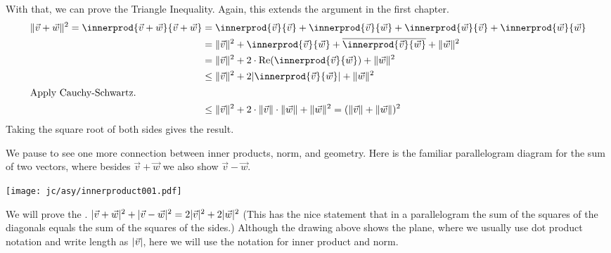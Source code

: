 With that, we can prove the Triangle Inequality.
Again, this extends the argument in the first chapter.
\begin{align*}
  \norm{\vec{v}+\vec{w}}^2
  =\innerprod{\vec{v}+\vec{w}}{\vec{v}+\vec{w}}  
  &=\innerprod{\vec{v}}{\vec{v}}
    +\innerprod{\vec{v}}{\vec{w}}  
    +\innerprod{\vec{w}}{\vec{v}}  
    +\innerprod{\vec{w}}{\vec{w}}   \\ 
  &=\norm{\vec{v}}^2
    +\innerprod{\vec{v}}{\vec{w}}  
    +\compconj{\innerprod{\vec{v}}{\vec{w}}}  
    +\norm{\vec{w}}^2              \\   
  &=\norm{\vec{v}}^2
    +2\cdot\RE{\innerprod{\vec{v}}{\vec{w}}}  
    +\norm{\vec{w}}^2      \\
  &\leq\norm{\vec{v}}^2
    +2\absval{\innerprod{\vec{v}}{\vec{w}}}  
    +\norm{\vec{w}}^2     \\
\intertext{Apply Cauchy-Schwartz.}
  &\leq\norm{\vec{v}}^2
    +2\cdot\norm{\vec{v}}\cdot\norm{\vec{w}}
    +\norm{\vec{w}}^2      
  =(\norm{\vec{v}}+\norm{\vec{w}})^2         
\end{align*}
Taking the square root of both sides gives the result.

We pause to see one more connection between inner products, norm, and geometry.
Here is the familiar parallelogram diagram for the sum of two vectors,
where besides $\vec{v}+\vec{w}$ we also show $\vec{v}-\vec{w}$. 
\begin{center}
  \texttt{[image: jc/asy/innerproduct001.pdf]}
\end{center}
We will prove the 
.
$\lvert\vec{v}+\vec{w}\rvert^2+\lvert\vec{v}-\vec{w}\rvert^2=2\lvert\vec{v}\rvert^2+2\lvert\vec{w}\rvert^2$
(This has the nice statement that in a parallelogram the sum of the squares 
of the diagonals equals the sum of the squares of the sides.)
Although the drawing above shows the plane, where we usually use dot product 
notation and write length as $\lvert\vec{v}\rvert$, 
here we will use the notation for inner product and norm.

